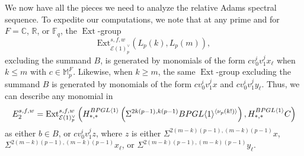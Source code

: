 \documentclass{amsart}
\theoremstyle{plain}
\numberwithin{theorem}{section}
\numberwithin{equation}{section}
\numberwithin{figure}{section}
\DeclareMathOperator{\Ext}{Ext}
\newcommand{\mF}{{\mathbb F}}
\newcommand{\mM}{{\mathbb M}}
\newcommand{\cE}{{\mathcal E}}
\newcommand{\0}{\langle 0 \rangle }
\begin{document}

We now have all the pieces we need to analyze the relative Adams spectral sequence. To expedite our computations, we note that at any prime and for $F= \mathbb{C}$, $\mathbb{R}$, or $\mathbb{F}_q$, the $\Ext$-group
\[
\text{Ext}^{s,f,w}_{\cE(1)^\vee_p}(L_p (k), L_p (m)),
\]
excluding the summand $B$, is generated by monomials of the form $cv_0^iv_1^jx_\ell$ when $k \le m$ with $c \in \mM_p^F$. Likewise, when $k \ge m$, the same $\Ext$-group excluding the summand $B$
is generated by monomials of the form $cv_0^iv_1^jx$ and $cv_0^iv_1^jy_\ell$. Thus, we can describe any monomial in 
\[
E_2^{s,f,w} = \textup{Ext}^{s,f,w}_{\mathcal{E}(1)^\vee_p}\left(H_{*,*}^{BPGL \langle 1 \rangle}\left(\Sigma^{2k(p-1), k(p-1)}BPGL \langle 1 \rangle^{\langle \nu_p(k!) \rangle}\right), H_{*,*}^{BPGL \langle 1 \rangle}C\right)
\]
as either $b \in B$, or $cv_0^iv_1^jz$, where $z$ is either $\Sigma^{2(m-k)(p-1), (m-k)(p-1)}x$, $\Sigma^{2(m-k)(p-1), (m-k)(p-1)}x_\ell$, or $\Sigma^{2(m-k)(p-1), (m-k)(p-1)}y_\ell$.

\end{document}

